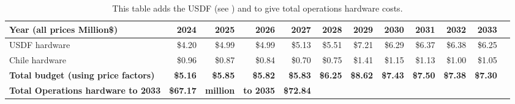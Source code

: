 \tiny \begin{longtable} { |p{}  |r  |r  |r  |r  |r  |r  |r  |r  |r  |r  |r |} 
\caption{This table adds the USDF (see ) and  to give total operations hardware costs. \label{tab:opsSummary}}\\ 
\hline 
\textbf{Year  (all prices Million\$)}&\textbf{2024}&\textbf{2025}&\textbf{2026}&\textbf{2027}&\textbf{2028}&\textbf{2029}&\textbf{2030}&\textbf{2031}&\textbf{2032}&\textbf{2033} \\ \hline
{USDF hardware}&{\$4.20}&{\$4.99}&{\$4.99}&{\$5.13}&{\$5.51}&{\$7.21}&{\$6.29}&{\$6.37}&{\$6.38}&{\$6.25} \\ \hline
{Chile hardware}&{\$0.96}&{\$0.87}&{\$0.84}&{\$0.70}&{\$0.75}&{\$1.41}&{\$1.15}&{\$1.13}&{\$1.00}&{\$1.05} \\ \hline
\textbf{Total budget (using price factors)}&\textbf{\$5.16}&\textbf{\$5.85}&\textbf{\$5.82}&\textbf{\$5.83}&\textbf{\$6.25}&\textbf{\$8.62}&\textbf{\$7.43}&\textbf{\$7.50}&\textbf{\$7.38}&\textbf{\$7.30} \\ \hline
\textbf{Total Operations hardware to 2033}&\textbf{\$67.17}&\textbf{million}&\textbf{to 2035}&\textbf{\$72.84}&&&&&& \\ \hline
\end{longtable} \normalsize
